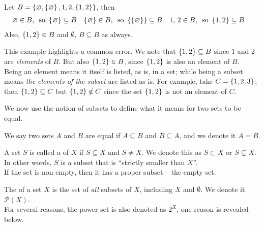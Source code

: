 \begin{example}
Let $B = \left\{\varnothing,\left\{\varnothing\right\},1,2,\left\{1,2\right\}\right\}$, then
\begin{align*}
\varnothing \in B,&\ \text{ so } \left\{\varnothing\right\} \subseteq B & \left\{\varnothing\right\} \in B,&\ \text{ so } \left\{\left\{\varnothing\right\}\right\} \subseteq B & 1,\,2 \in B,&\ \text{ so } \left\{1,2\right\} \subseteq B
\end{align*}
Also, $\left\{1,2\right\} \in B$ and $\emptyset,\,B \subseteq B$ as always.

\begin{dangerbend}
This example highlights a common error. We note that $\left\{1,2\right\} \subseteq B$ since $1$ and $2$ are \emph{elements} of $B$. But also $\left\{1,2\right\} \in B$, since $\left\{1,2\right\}$ is also an element of $B$.\\[0.5em]
Being an element means it itself is listed, as is, in a set; while being a subset means \emph{the elements of the subset} are listed as is. For example, take $C = \left\{1,2,3\right\}$; then $\left\{1,2\right\} \subseteq C$ but $\left\{1,2\right\} \notin C$ since the set $\left\{1,2\right\}$ is not an element of $C$.
\end{dangerbend}
\end{example}

\vspace*{1em}

We now use the notion of subsets to define what it means for two sets to be equal.
\begin{definition}\label{equality-sets}
We say two sets $A$ and $B$ are equal if $A \subseteq B$ and $B \subseteq A$, and we denote it $A = B$.
\end{definition}

\vspace*{1em}

\begin{definition}
A set $S$ is called a  of $X$ if $S \subseteq X$ and $S \neq X$. We denote this as $S \subset X$ or $S \subsetneq X$. In other words, $S$ is a subset that is ``strictly smaller than $X$''.\\[0.5em]
If the set is non-empty, then it has a proper subset -- the empty set.
\end{definition}

\vspace*{1em}

\begin{definition}\label{power-set}
The  of a set $X$ is the set of \emph{all} subsets of $X$, including $X$ and $\emptyset$. We denote it $\mathscr{P}(X)$.\\[0.5em]
For several reasons, the power set is also denoted as $2^X$, one reason is revealed below.
\end{definition}

